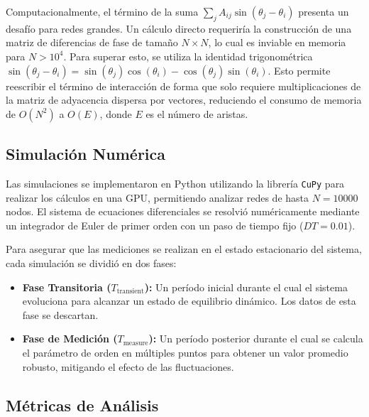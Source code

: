 \documentclass[12pt, a4paper]{article}
\begin{document}
Computacionalmente, el término de la suma \(\sum_j A_{ij} \sin(\theta_j - \theta_i)\) presenta un desafío para redes grandes. Un cálculo directo requeriría la construcción de una matriz de diferencias de fase de tamaño \(N \times N\), lo cual es inviable en memoria para \(N > 10^4\). Para superar esto, se utiliza la identidad trigonométrica \(\sin(\theta_j - \theta_i) = \sin(\theta_j)\cos(\theta_i) - \cos(\theta_j)\sin(\theta_i)\). Esto permite reescribir el término de interacción de forma que solo requiere multiplicaciones de la matriz de adyacencia dispersa por vectores, reduciendo el consumo de memoria de \(O(N^2)\) a \(O(E)\), donde \(E\) es el número de aristas.

\subsection{Simulación Numérica}

Las simulaciones se implementaron en Python utilizando la librería \texttt{CuPy} para realizar los cálculos en una GPU, permitiendo analizar redes de hasta \(N=10000\) nodos. El sistema de ecuaciones diferenciales se resolvió numéricamente mediante un integrador de Euler de primer orden con un paso de tiempo fijo (\(DT=0.01\)).

Para asegurar que las mediciones se realizan en el estado estacionario del sistema, cada simulación se dividió en dos fases:
\begin{itemize}
  \item \textbf{Fase Transitoria (\(T_{\text{transient}}\)):} Un período inicial durante el cual el sistema evoluciona para alcanzar un estado de equilibrio dinámico. Los datos de esta fase se descartan.
  \item \textbf{Fase de Medición (\(T_{\text{measure}}\)):} Un período posterior durante el cual se calcula el parámetro de orden en múltiples puntos para obtener un valor promedio robusto, mitigando el efecto de las fluctuaciones.
\end{itemize}

\subsection{Métricas de Análisis}
\end{document}
